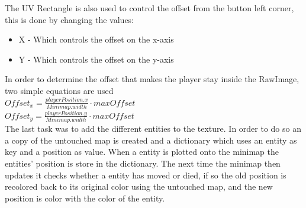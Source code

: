The UV Rectangle is also used to control the offset from the button left corner, this is done by changing the values:
\begin{itemize}
\item X - Which controls the offset on the x-axis
\item Y - Which controls the offset on the y-axis
\end{itemize}
In order to determine the offset that makes the player stay inside the RawImage, two simple equations are used\\
$Offset_x = \frac{playerPosition.x}{Minimap.width} \cdot maxOffset$\\
$Offset_y = \frac{playerPosition.y}{Minimap.width} \cdot maxOffset$\\
The last task was to add the different entities to the texture. 
In order to do so an a copy of the untouched map is created and a dictionary which uses an entity as key and a position as value.
When a entity is plotted onto the minimap the entities' position is store in the dictionary.
The next time the minimap then updates it checks whether a entity has moved or died, if so the old position is recolored back to its original color using the untouched map, and the new position is color with the color of the entity.